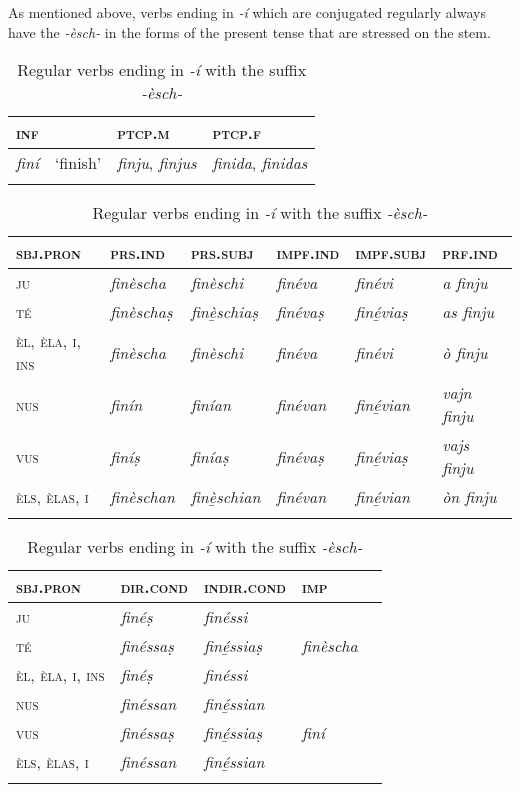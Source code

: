 As mentioned above, verbs ending in \textit{-í} which are conjugated regularly always have the  \textit{-èsch-} in the forms of the present tense that are stressed on the stem.


\begin{table}
	\caption{Regular verbs ending in \textit{-í} with the suffix \textit{-èsch-}}
	\label{tab:reg.verb-i}
	\begin{tabularx}{.7\textwidth}{llll}
		
		\lsptoprule
		\textsc{inf} & & \textsc{ptcp.m}  & \textsc{ptcp.f}  \\
		\midrule
		\textit{finí} & `finish' & \textit{finju}, \textit{finjus} & \textit{finida}, \textit{finidas} \\
		\lspbottomrule  
	\end{tabularx}
	
	\medskip
	
	\begin{tabularx}{\textwidth}{p{}lllll}
		\lsptoprule
		\textsc{sbj.pron} &\textsc{prs.ind} &\textsc{prs.subj} &\textsc{impf.ind} & \textsc{impf.subj} &\textsc{prf.ind}\\
		\midrule
		\textsc{ju} & \textit{finèscha} & \textit{finèschi} & \textit{finéva} & \textit{finévi} & \textit{a finju} \\
		\textsc{té} & \textit{finèschaṣ} & \textit{finè̱schiaṣ} & \textit{finévaṣ} & \textit{finé̱viaṣ} & \textit{as finju}\\
		\textsc{èl, èla, i, ins} & \textit{finèscha}  & \textit{finèschi} & \textit{finéva} & \textit{finévi} & \textit{ò finju}\\
		\textsc{nus} & \textit{finín} & \textit{finían} & \textit{finévan} & \textit{finé̱vian} &\textit{vajn finju}\\
		\textsc{vus} & \textit{finíṣ} & \textit{finíaṣ} & \textit{finévaṣ} & \textit{finé̱viaṣ} & \textit{vajs finju} \\
		\textsc{èls, èlas, i} & \textit{finèschan}  & \textit{finè̱schian} & \textit{finévan} & \textit{finé̱vian} & \textit{òn finju}\\
		\lspbottomrule
	\end{tabularx}
	
	\medskip
	
	\begin{tabularx} {\textwidth}{p{2cm}XXXX}
		\lsptoprule
		\textsc{sbj.pron} &\textsc{dir.cond} &  \textsc{indir.cond} &\textsc{imp}\\
		\midrule
		\textsc{ju} & \textit{finéṣ} & \textit{finéssi} \\
		\textsc{té} & \textit{finéssaṣ} &\textit{finé̱ssiaṣ}  &  \textit{finèscha}\\
		\textsc{èl, èla, i, ins} & \textit{finéṣ}  & \textit{finéssi}\\
		\textsc{nus} & \textit{finéssan} &  \textit{finé̱ssian}\\
		\textsc{vus} &  \textit{finéssaṣ} & \textit{finé̱ssiaṣ} & \textit{finí}\\
		\textsc{èls, èlas, i} & \textit{finéssan} & \textit{finé̱ssian}\\
		\lspbottomrule
	\end{tabularx} 
\end{table}


